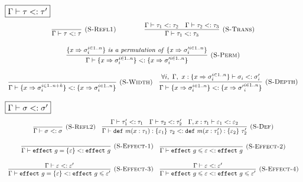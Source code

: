\begin{figure}[!t]
\flushleft
\footnotesize{
$\fbox{$\Gamma \vdash \tau <: \tau'$}$
\[
\begin{array}{c}
\infer[\textsc{(S-Refl1)}]
  {\Gamma \vdash \tau <:\tau}
  {}%
~~~~~~~~~~\hspace{10pt}
\infer[\textsc{(S-Trans)}]
  {\Gamma \vdash \tau_1 <: \tau_3}
  {\Gamma \vdash \tau_1 <: \tau_2 & \Gamma \vdash \tau_2 <: \tau_3}\\[3ex]

\infer[\textsc{(S-Perm)}]
  {\Gamma \vdash \{ x \Rightarrow \sigma_i^{i \in 1..n} \} <: \{ x \Rightarrow \sigma_i'^{i \in 1..n} \}}
  {\{ x \Rightarrow \sigma_i^{i \in 1..n} \}~\mathit{is~a~permutation~of}~\{ x \Rightarrow \sigma_i'^{i \in 1..n} \}}\\[3ex]
\infer[\textsc{(S-Width)}]
  {\Gamma \vdash \{ x \Rightarrow \sigma_i^{i \in 1..n + k} \} <: \{ x \Rightarrow \sigma_i^{i \in 1..n} \}}
  {} \quad 
\infer[\textsc{(S-Depth)}]
  {\Gamma \vdash \{ x \Rightarrow \sigma_i^{i \in 1..n} \} <: \{ x \Rightarrow {\sigma'}_i^{i \in 1..n} \}}
  {\forall i,~\Gamma,~x : \{ x \Rightarrow {\sigma}_i^{i \in 1..n} \} \vdash \sigma_i <: \sigma_i'}

\end{array}
\]


\noindent$\fbox{$\Gamma \vdash \sigma <: \sigma'$}$
\[
\begin{array}{c}
\infer[\textsc{(S-Refl2)}]
  {\Gamma \vdash \sigma <: \sigma}
  {} \quad
\infer[\textsc{(S-Def)}]
  {\Gamma \vdash \keyw{def} m(x : \tau_1) : \{ \varepsilon_1 \}~\tau_2 <: \keyw{def} m(x : \tau_1') : \{ \varepsilon_2 \}~\tau_2'}
  {\Gamma \vdash \tau_1' <: \tau_1 & \Gamma \vdash \tau_2 <: \tau_2' & \Gamma, x : \tau_1 \vdash \varepsilon_1 <: \varepsilon_2 }\\[3ex]

\infer[\textsc{(S-Effect-1)}]
  {\Gamma \vdash \keyw{effect} g = \{ \varepsilon \} <: \keyw{effect} g}
  {}\quad
  \infer[\textsc{(S-Effect-2)}]
  {\Gamma  \vdash \keyw{effect} g \leqslant \varepsilon <: \keyw{effect} g}
  {} \\[3ex]
  
\infer[\textsc{(S-Effect-3)}]
  {\Gamma  \vdash \keyw{effect} g = \{\varepsilon\} <: \keyw{effect} g \leqslant \varepsilon'}
  {\Gamma  \vdash \varepsilon <: \varepsilon'}\quad

\infer[\textsc{(S-Effect-4)}]
  {\Gamma  \vdash \keyw{effect} g \leqslant \varepsilon <: \keyw{effect} g \leqslant \varepsilon'}
  {\Gamma  \vdash \varepsilon <: \varepsilon'}\\[3ex]
  

\end{array}\]}
\end{figure}
